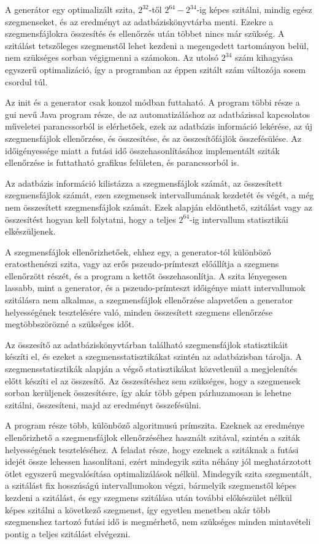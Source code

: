 A generátor egy optimalizált szita, $2^{32}$-től $2^{64}-2^{34}$-ig képes szitálni,
mindig egész szegmenseket, és az eredményt az adatbáziskönyvtárba menti.
Ezekre a szegmensfájlokra összesítés és ellenőrzés után többet nincs már szükség.
A szitálást tetszőleges szegmenstől lehet kezdeni a megengedett tartományon belül,
nem szükséges sorban végigmenni a számokon.
Az utolsó $2^{34}$ szám kihagyása egyszerű
optimalizáció, így a programban az éppen
szitált szám változója sosem csordul túl.

Az init és a generator csak konzol módban futtaható.
A program többi része a gui nevű Java program része,
de az automatizáláshoz az adatbázissal kapcsolatos műveletei
parancssorból is elérhetőek, ezek az adatbázis információ lekérése,
az új szegmensfájlok ellenőrzése, és összesítése, és az összesítőfájlök összefésülése.
Az időigényessége miatt a futási idő összehasonlításához implementált
sziták ellenőrzése is futtatható grafikus felületen, és parancssorból is.

Az adatbázis információ kilistázza a szegmensfájlok számát,
az összesített szegmensfájlok számát, ezen szegmensek intervallumának kezdetét
és végét, a még nem összesített szegmensfájlok számát.
Ezek alapján eldönthető, szitálást vagy az összesítést
hogyan kell folytatni, hogy a teljes $2^{64}$-ig intervallum statisztikái elkészüljenek.

A szegmensfájlok ellenőrizhetőek, ehhez egy, a generator-tól különböző
eratosthenészi szita, vagy az erős pszeudo-prímteszt előállítja
a szegmens ellenőrzött részét, és a program a kettőt összehasonlítja.
A szita lényegesen lassabb, mint a generator, és a pszeudo-prímteszt
időigénye miatt intervallumok szitálásra nem alkalmas,
a szegmensfájlok ellenőrzése alapvetően a generator helyességének
tesztelésére való, minden összesített szegmens ellenőrzése megtöbbszörözné
a szükséges időt.

Az összesítő az adatbáziskönyvtárban található szegmensfájlok statisztikáit készíti el,
és ezeket a szegmensstatisztikákat szintén az adatbázisban tárolja.
A szegmensstatisztikák alapján a végső statisztikákat közvetlenül
a megjelenítés előtt készíti el az összesítő.
Az összesítéshez sem szükséges, hogy a szegmensek sorban kerüljenek összesítésre,
így akár több gépen párhuzamosan is lehetne szitálni, összesíteni,
majd az eredményt összefésülni.

A program része több, különböző algoritmusú prímszita.
Ezeknek az eredménye ellenőrizhető a szegmensfájlok ellenőrzéséhez
használt szitával, szintén a sziták helyességének teszteléséhez.
A feladat része, hogy ezeknek a szitáknak a futási idejét össze lehessen hasonlítani,
ezért mindegyik szita néhány jól meghatárzotott ötlet egyszerű megvalósítása
optimalizálások nélkül.
Mindegyik szita szegmentált, a szitálást fix hosszúságú intervallumokon végzi,
bármelyik szegmenstől képes kezdeni a szitálást, és egy szegmens szitálása után
további előkészület nélkül képes szitálni a következő szegmenst,
így egyetlen menetben akár több szegmenshez tartozó futási idő is megmérhető,
nem szükséges minden mintavételi pontig a teljes szitálást elvégezni.

